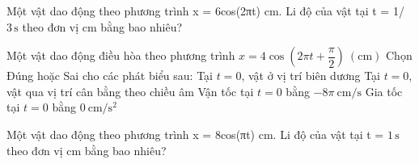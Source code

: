 \begin{ex}
Một vật dao động theo phương trình x = 6cos(2πt) cm. Li độ của vật tại t = 1/ $3\,\text{s}$ theo đơn vị cm bằng bao nhiêu?
\end{ex}

\begin{ex}
Một vật dao động điều hòa theo phương trình $x = 4\cos(2\pi t + \dfrac{\pi}{2})\ (\mathrm{cm})$ 
	Chọn Đúng hoặc Sai cho các phát biểu sau:
\choiceTF
{Tại $t = 0$, vật ở vị trí biên dương}
{\True Tại $t = 0$, vật qua vị trí cân bằng theo chiều âm}
{\True Vận tốc tại $t = 0$ bằng $-8\pi\ \mathrm{cm/s}$}
{\True Gia tốc tại $t = 0$ bằng $0\ \mathrm{cm/s^2}$}
\end{ex}

\begin{ex}
Một vật dao động theo phương trình x = 8cos(πt) cm. Li độ của vật tại t = $1\,\text{s}$ theo đơn vị cm bằng bao nhiêu?
\end{ex}

